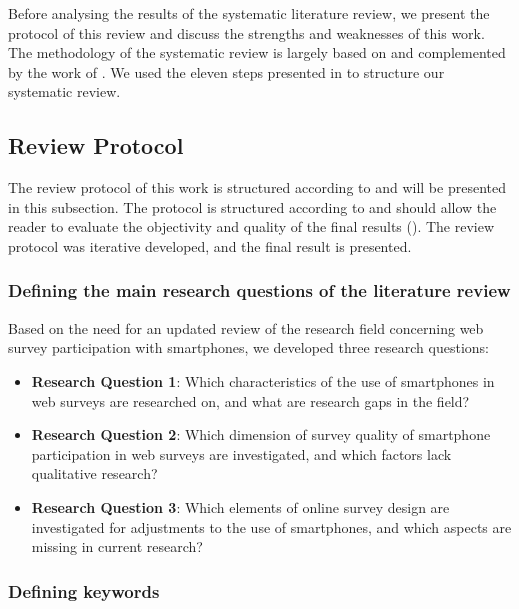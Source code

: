 Before analysing the results of the systematic literature review, we present the protocol of this review and discuss the strengths and weaknesses of this work. The methodology of the systematic review is largely based on \cite{weidt_systematic_2016} and complemented by the work of \cite{xiao_guidance_2017,petticrew_systematic_2008,snyder_literature_2019,denyer_producing_2009}. We used the eleven steps presented in \cite{weidt_systematic_2016} to structure our systematic review.

\subsection{Review Protocol}

The review protocol of this work is structured according to \cite{weidt_systematic_2016} and will be presented in this subsection. The protocol is structured according to \cite{weidt_systematic_2016} and should allow the reader to evaluate the objectivity and quality of the final results (\cite{page_prisma_2021}). The review protocol was iterative developed, and the final result is presented.


\subsubsection{Defining the main research questions of the literature review}

Based on the need for an updated review of the research field concerning web survey participation with smartphones, we developed three research questions:

\begin{itemize}
   \item \textbf{Research Question 1}: Which characteristics of the use of smartphones in web surveys are researched on, and what are research gaps in the field? 
   \item \textbf{Research Question 2}: Which dimension of survey quality of smartphone participation in web surveys are investigated, and which factors lack qualitative research?
   \item \textbf{Research Question 3}: Which elements of online survey design are investigated for adjustments to the use of smartphones, and which aspects are missing in current research?
\end{itemize}

\subsubsection{Defining keywords}
\label{subsubsec: Defining search string}

